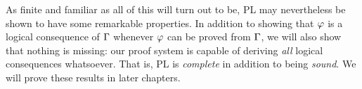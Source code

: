 As finite and familiar as all of this will turn out to be, PL may nevertheless be shown to have some remarkable properties.
In addition to showing that $\varphi$ is a logical consequence of $\Gamma$ whenever $\varphi$ can be proved from $\Gamma$, we will also show that nothing is missing: our proof system is capable of deriving \textit{all} logical consequences whatsoever. 
That is, PL is \textit{complete} in addition to being \textit{sound}.
We will prove these results in later chapters.




